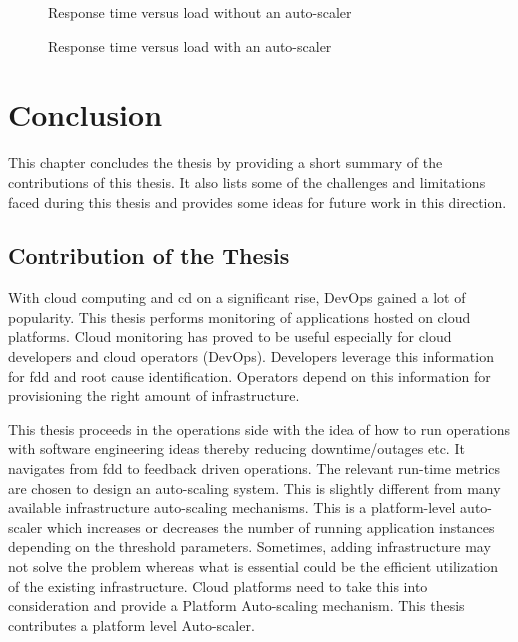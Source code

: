 \documentclass[article,type=msc,colorback,12pt,accentcolor=tud8b,table]{tudthesis}
\begin{document}
   \begin{figure}[H]
   	\begin{center}
   		\makebox[\textwidth]{\texttt{[image: E15]}}
   	\end{center}
   	\caption{Response time versus load without an auto-scaler}
   		\label{fig:without_autoscaler}
   \end{figure}
   
      \begin{figure}[H]
      	\begin{center}
      		\makebox[\textwidth]{\texttt{[image: E16]}}
      	\end{center}
      	\caption{Response time versus load with an auto-scaler}
      		\label{fig:with_autoscaler}
      \end{figure}

\cleardoublepage

 \hfill 
\section{Conclusion}	 
	 \hfill \break

This chapter concludes the thesis by providing a short summary of the contributions of this thesis. It also lists some of the challenges and limitations faced during this thesis and provides some ideas for future work in this direction.
 
\subsection{Contribution of the Thesis}

With cloud computing and \gls{cd} on a significant rise, DevOps gained a lot of popularity. This thesis performs monitoring of applications hosted on cloud platforms. Cloud monitoring has proved to be useful especially for cloud developers and cloud operators (DevOps). Developers leverage this information for \gls{fdd} and root cause identification. Operators depend on this information for provisioning the right amount of infrastructure.

This thesis proceeds in the operations side with the idea of how to run operations with software engineering ideas thereby reducing downtime/outages etc. It navigates from \gls{fdd} to feedback driven operations. The relevant run-time metrics are chosen to design an auto-scaling system. This is slightly different from many available infrastructure auto-scaling mechanisms. This is a platform-level auto-scaler which increases or decreases the number of running application instances depending on the threshold parameters. Sometimes, adding infrastructure may not solve the problem whereas what is essential could be the efficient utilization of the existing infrastructure. Cloud platforms need to take this into consideration and provide a Platform Auto-scaling mechanism. This thesis contributes a platform level Auto-scaler. 
\end{document}
